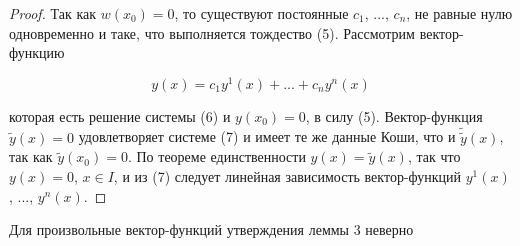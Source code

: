 \begin{proof}
Так как $w(x_0)=0$, то существуют постоянные $c_1$, ..., $c_n$, не равные нулю одновременно и таке, что выполняется тождество (5). Рассмотрим вектор-функцию

\begin{equation}
    y(x) = c_1y^1(x) + ... + c_ny^n(x)
\end{equation}

которая есть решение системы (6) и $y(x_0) = 0$, в силу (5). Вектор-функция $\widetilde{y}(x) = 0$ удовлетворяет системе (7) и имеет те же данные Коши, что и $\widetilde{\widetilde{y}}(x)$, так как $\widetilde{y}(x_0) = 0$. По теореме единственности $y(x)=\widetilde{y}(x)$, так что $y(x) = 0$, $x \in I$, и из (7) следует линейная зависимость вектор-функций $y^1(x)$, ..., $y^n(x)$.

\end{proof}

\begin{theorem}
Для произвольные вектор-функций утверждения леммы 3 неверно
\end{theorem}